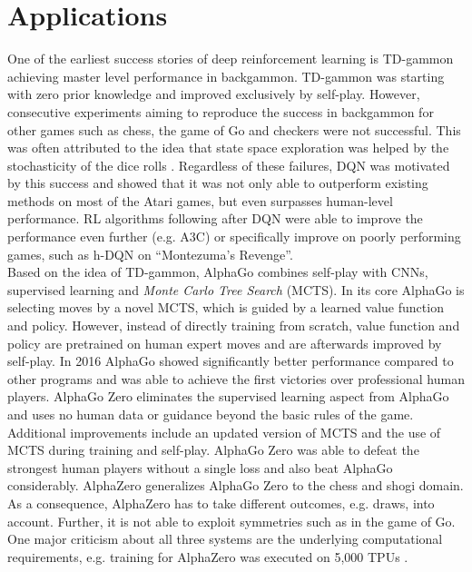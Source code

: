     \section{Applications \label{sec:applications}}
    One of the earliest success stories of deep reinforcement learning is TD-gammon \cite{Tesauro1994} achieving master level performance in backgammon.
    TD-gammon was starting with zero prior knowledge and improved exclusively by self-play.
    However, consecutive experiments aiming to reproduce the success in backgammon for other games such as chess, the game of Go and checkers were not successful.
    This was often attributed to the idea that state space exploration was helped by the stochasticity of the dice rolls \cite{Pollack1997a}.
    Regardless of these failures, DQN was motivated by this success and showed that it was not only able to outperform existing methods on most of the Atari games, but even surpasses human-level performance. 
    RL algorithms following after DQN were able to improve the performance even further (e.g. A3C) or specifically improve on poorly performing games, such as h-DQN on ``Montezuma's Revenge''.\\
    Based on the idea of TD-gammon, AlphaGo \cite{Silver2016} combines self-play with CNNs, supervised learning and \textit{Monte Carlo Tree Search} (MCTS). 
    In its core AlphaGo is selecting moves by a novel MCTS, which is guided by a learned value function and policy.
    However, instead of directly training from scratch, value function and policy are pretrained on human expert moves and are afterwards improved by self-play.
    In 2016 AlphaGo showed significantly better performance compared to other programs and was able to achieve the first victories over professional human players.
    AlphaGo Zero \cite{Silver2017a} eliminates the supervised learning aspect from AlphaGo and uses no human data or guidance beyond the basic rules of the game.
    Additional improvements include an updated version of MCTS and the use of MCTS during training and self-play.
    AlphaGo Zero was able to defeat the strongest human players without a single loss and also beat AlphaGo considerably.
    AlphaZero \cite{Silver2017} generalizes AlphaGo Zero to the chess and shogi domain.
    As a consequence, AlphaZero has to take different outcomes, e.g. draws, into account.
    Further, it is not able to exploit symmetries such as in the game of Go.
    One major criticism about all three systems are the underlying computational requirements, e.g. training for AlphaZero was executed on 5,000 TPUs \cite{Jouppi2017}. 
